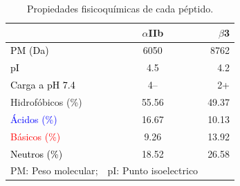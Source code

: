     
\begin{table}[H]   
\centering 
  \caption{Propiedades fisicoquímicas de cada péptido.}\label{tab:percent_hidrofo}
    \begin{tabular}{lcr}

     \toprule  %
       & $\alpha$IIb & $\beta$3\\
     \bottomrule %

      \textcolor{black}{PM (Da)}            & 6050  & 8762\\
      \textcolor{black}{pI}            		& 4.5  & 4.2\\
      \textcolor{black}{Carga a pH 7.4}            & 4--  & 2+\\
        \textcolor{mygreen}{Hidrofóbicos (\%)}   & 55.56 & 49.37\\
        \textcolor{blue}{Ácidos (\%)}            & 16.67 & 10.13\\
        \textcolor{red}{Básicos (\%)}            & 9.26  & 13.92\\
        \textcolor{black}{Neutros (\%)}          & 18.52 & 26.58\\ %
      \bottomrule %
      \scriptsize{PM: Peso  molecular}; & \scriptsize{pI: Punto isoelectrico}
    \end{tabular}
    
    \end{table}


